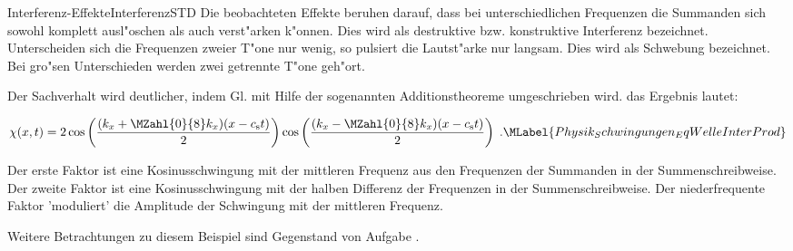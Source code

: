 \begin{MXContent}{Interferenz-Effekte}{Interferenz}{STD}
Die beobachteten Effekte beruhen darauf, dass bei unterschiedlichen Frequenzen die Summanden sich sowohl komplett ausl"oschen als auch verst"arken k"onnen. Dies wird als destruktive bzw. konstruktive Interferenz bezeichnet. Unterscheiden sich die Frequenzen zweier T"one nur wenig, so pulsiert die Lautst"arke nur langsam. Dies wird als Schwebung bezeichnet. Bei gro"sen Unterschieden werden zwei getrennte T"one geh"ort.

Der Sachverhalt wird deutlicher, indem Gl.  mit Hilfe der sogenannten Additionstheoreme umgeschrieben wird. das Ergebnis lautet:

\begin{equation}
  \chi(x,t)=2\cos\left(\frac{(k_x+\MZahl{0}{8}k_x)(x-c_\mathrm{s}t)}{2}\right)\cos\left(\frac{(k_x-\MZahl{0}{8}k_x)(x-c_\mathrm{s}t)}{2}\right)\;.\MLabel{Physik_Schwingungen_EqWelleInterProd}
\end{equation}

Der erste Faktor ist eine Kosinusschwingung mit der mittleren Frequenz aus den Frequenzen der Summanden in der Summenschreibweise. Der zweite Faktor ist eine Kosinusschwingung mit der halben Differenz der Frequenzen in der Summenschreibweise. Der niederfrequente Faktor 'moduliert' die Amplitude der Schwingung mit der mittleren Frequenz.

Weitere Betrachtungen zu diesem Beispiel sind Gegenstand von Aufgabe
.

\end{MXContent}


